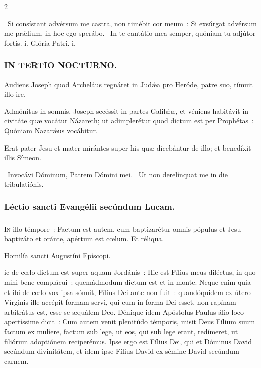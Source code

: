 \documentclass[9pt,twoside]{extarticle}
\begin{document}
\begin{multicols}{2}
{\begin{tightlist}{}
\item {}~Si consístant advérsum me castra, non timébit cor meum~: \textred{*} Si exsúrgat advérsum me prǽlium, in hoc ego sperábo. ~In te cantátio mea semper, quóniam tu adjútor fortis. i. Glória Patri. i.
\end{tightlist}

\subsubsection*{\center \textsc{IN TERTIO NOCTURNO.}}
\begin{tightlist}{}
\item {} Audiens Joseph quod Archeláus regnáret in Judǽa pro Heróde, patre suo, tímuit illo ire.
\item {} Admónitus in somnis, Joseph secéssit in partes Galilǽæ, et véniens habitávit in civitáte quæ vocátur Názareth; ut adimplerétur quod dictum est per Prophétas~: Quóniam Nazarǽus vocábitur.
\item {} Erat pater Jesu et mater mirántes super his quæ dicebántur de illo; et benedíxit illis Símeon.
\item {}~Invocávi Dóminum, Patrem Dómini mei. ~Ut non derelínquat me in die tribulatiónis.
\end{tightlist}

\subsubsection*{\center Léctio sancti Evangélii secúndum Lucam.}
\subsubsection*{\center {}}
\lettrine{I}n illo témpore~: Factum est autem, cum baptizarétur omnis pópulus et Jesu baptizáto et oránte, apértum est cœlum. Et réliqua.

\begin{center}Homilía sancti Augustíni Epíscopi.\\
\end{center}
ic de cœlo dictum est super aquam Jordánis~: Hic est Fílius meus diléctus, in quo mihi bene complácui~: quemádmodum dictum est et in monte. Neque enim quia et ibi de cœlo vox ipsa sónuit, Fílius Dei ante non fuit~: quandóquidem ex útero Vírginis ille accépit formam servi, qui cum in forma Dei esset, non rapínam arbitrátus est, esse se æquálem Deo. Dénique idem Apóstolus Paulus álio loco apertíssime dicit~: Cum autem venit plenitúdo témporis, misit Deus Fílium suum factum ex mulíere, factum sub lege, ut eos, qui sub lege erant, redímeret, ut filiórum adoptiónem reciperémus. Ipse ergo est Fílius Dei, qui et Dóminus David secúndum divinitátem, et idem ipse Fílius David ex sémine David secúndum carnem.

}
\end{multicols}
\end{document}
